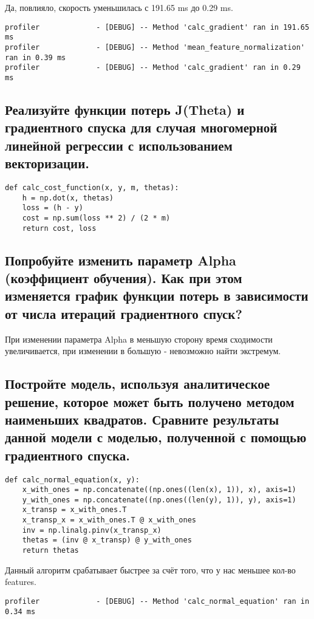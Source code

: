 Да, повлияло, скорость уменьшилась с 191.65 ms до 0.29 ms.

\begin{lstlisting}
profiler             - [DEBUG] -- Method 'calc_gradient' ran in 191.65 ms
profiler             - [DEBUG] -- Method 'mean_feature_normalization' ran in 0.39 ms
profiler             - [DEBUG] -- Method 'calc_gradient' ran in 0.29 ms
\end{lstlisting}

\subsection{Реализуйте функции потерь J(Theta) и градиентного спуска для случая многомерной линейной регрессии с использованием векторизации.}

\begin{lstlisting}
def calc_cost_function(x, y, m, thetas):
    h = np.dot(x, thetas)
    loss = (h - y)
    cost = np.sum(loss ** 2) / (2 * m)
    return cost, loss
\end{lstlisting}

\subsection{Попробуйте изменить параметр Alpha (коэффициент обучения). Как при этом изменяется график функции потерь в зависимости от числа итераций градиентного спуск?}

При изменении параметра Alpha в меньшую сторону время сходимости увеличивается, при изменении в большую - невозможно найти экстремум.

\subsection{Постройте модель, используя аналитическое решение, которое может быть получено методом наименьших квадратов. Сравните результаты данной модели с моделью, полученной с помощью градиентного спуска.}

\begin{lstlisting}
def calc_normal_equation(x, y):
    x_with_ones = np.concatenate((np.ones((len(x), 1)), x), axis=1)
    y_with_ones = np.concatenate((np.ones((len(y), 1)), y), axis=1)
    x_transp = x_with_ones.T
    x_transp_x = x_with_ones.T @ x_with_ones
    inv = np.linalg.pinv(x_transp_x)
    thetas = (inv @ x_transp) @ y_with_ones
    return thetas
\end{lstlisting}

Данный алгоритм срабатывает быстрее за счёт того, что у нас меньшее кол-во features.

\begin{lstlisting}
profiler             - [DEBUG] -- Method 'calc_normal_equation' ran in 0.34 ms
\end{lstlisting}


